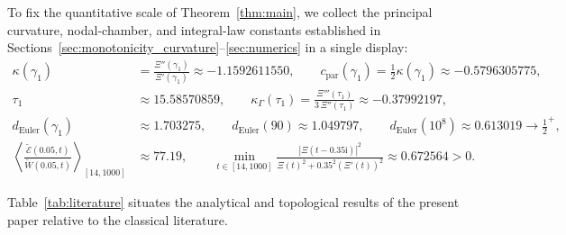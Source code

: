 \documentclass[11pt,a4paper,reqno]{amsart}
\theoremstyle{definition}
\theoremstyle{remark}
\numberwithin{equation}{section}
\newcommand{\ii}{\mathrm{i}}
\newcommand{\Wtil}{\widetilde{W}}
\newcommand{\Etil}{\widetilde{\mathcal{E}}}
\begin{document}
To fix the quantitative scale of Theorem~\ref{thm:main}, we collect the principal curvature, nodal-chamber, and integral-law constants established in Sections~\ref{sec:monotonicity_curvature}--\ref{sec:numerics} in a single display:
\begin{equation}\label{eq:canonical_constants}
\begin{aligned}
\kappa(\gamma_1) &= \frac{\Xi''(\gamma_1)}{\Xi'(\gamma_1)} \approx -1.1592611550, \qquad
c_{\mathrm{par}}(\gamma_1) = \frac{1}{2}\kappa(\gamma_1) \approx -0.5796305775, \\
\tau_1 &\approx 15.58570859, \qquad
\kappa_\Gamma(\tau_1) = \frac{\Xi'''(\tau_1)}{3\,\Xi''(\tau_1)} \approx -0.37992197, \\
d_{\mathrm{Euler}}(\gamma_1) &\approx 1.703275, \qquad
d_{\mathrm{Euler}}(90) \approx 1.049797, \qquad
d_{\mathrm{Euler}}(10^8) \approx 0.613019 \to \tfrac{1}{2}^+, \\
\left\langle\frac{\Etil(0.05, t)}{\Wtil(0.05, t)}\right\rangle_{[14,1000]} &\approx 77.19, \qquad
\min_{t\in[14,1000]} \frac{|\Xi(t-0.35\ii)|^2}{\Xi(t)^2 + 0.35^2(\Xi'(t))^2} \approx 0.672564 > 0.
\end{aligned}
\end{equation}

Table~\ref{tab:literature} situates the analytical and topological results of the present paper relative to the classical literature.
\end{document}
